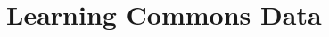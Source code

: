 \documentclass{beamer}
\begin{document}
\begin{frame}
\end{frame}



\section{Learning Commons Data}

            
                
\end{document}

